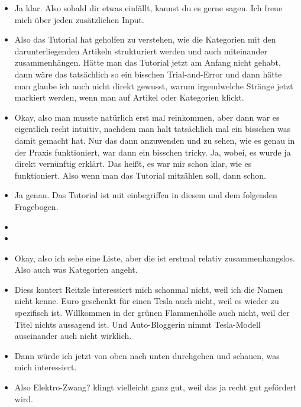 {\begin{itemize}[]
            \item {} Ja klar. Also sobald dir etwas einfällt, kannst du es gerne sagen. Ich freue mich über jeden zusätzlichen Input.
            \item {} Also das Tutorial hat geholfen zu verstehen, wie die Kategorien mit den darunterliegenden Artikeln strukturiert werden und auch miteinander zusammenhängen.
                  Hätte man das Tutorial jetzt am Anfang nicht gehabt, dann wäre das tatsächlich so ein bisschen Trial-and-Error und dann hätte man glaube ich auch nicht direkt gewusst, warum irgendwelche Stränge jetzt markiert werden, wenn man auf Artikel oder Kategorien klickt.
            \item {} Okay, also man musste natürlich erst mal reinkommen, aber dann war es eigentlich recht intuitiv, nachdem man halt tatsächlich mal ein bisschen was damit gemacht hat.
                  Nur das dann anzuwenden und zu sehen, wie es genau in der Praxis funktioniert, war dann ein bisschen tricky.
                  Ja, wobei, es wurde ja direkt vernünftig erklärt.
                  Das heißt, es war mir schon klar, wie es funktioniert.
                  Also wenn man das Tutorial mitzählen soll, dann schon.
            \item {} Ja genau. Das Tutorial ist mit einbegriffen in diesem und dem folgenden Fragebogen.
            \item {}
            \item {}
            \item {} Okay, also ich sehe eine Liste, aber die ist erstmal relativ zusammenhangslos.
                  Also auch was Kategorien angeht.
            \item {} \flqq Diess kontert Reitzle\frqq{} interessiert mich schonmal nicht, weil ich die Namen nicht kenne.
                   Euro geschenkt für einen Tesla\frqq{} auch nicht, weil es wieder zu spezifisch ist.
                  \flqq Willkommen in der grünen Flammenhölle\frqq{} auch nicht, weil der Titel nichts aussagend ist.
                  Und \flqq Auto-Bloggerin nimmt Tesla-Modell auseinander\frqq{} auch nicht wirklich.
            \item {} Dann würde ich jetzt von oben nach unten durchgehen und schauen, was mich interessiert.
            \item {} Also \flqq Elektro-Zwang?\frqq{} klingt vielleicht ganz gut, weil das ja recht gut gefördert wird.

\end{itemize}}
